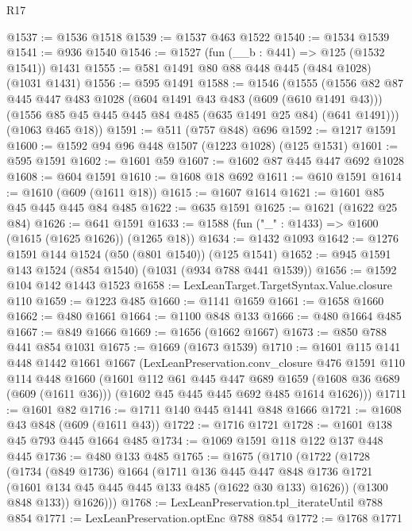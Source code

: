 \begin{lexlean}{R17}
\begin{coremodule}
@1537 := @1536 @1518
@1539 := @1537 @463 @1522
@1540 := @1534 @1539
@1541 := @936 @1540
@1546 := @1527 (fun (__b : @441) => @125 (@1532 @1541)) @1431
@1555 := @581 @1491 @80 @88 @448 @445 (@484 @1028) (@1031 @1431)
@1556 := @595 @1491
@1588 := @1546
    (@1555
      (@1556
        @82
        @87
        @445
        @447
        @483
        @1028
        (@604 @1491 @43 @483 (@609 (@610 @1491 @43)))
        (@1556 @85 @45 @445 @445 @84 @485 (@635 @1491 @25 @84) (@641 @1491)))
      (@1063 @465 @18))
@1591 := @511 (@757 @848) @696
@1592 := @1217 @1591
@1600 := @1592 @94 @96 @448 @1507 (@1223 @1028) (@125 @1531)
@1601 := @595 @1591
@1602 := @1601 @59
@1607 := @1602 @87 @445 @447 @692 @1028
@1608 := @604 @1591
@1610 := @1608 @18 @692
@1611 := @610 @1591
@1614 := @1610 (@609 (@1611 @18))
@1615 := @1607 @1614
@1621 := @1601 @85 @45 @445 @445 @84 @485
@1622 := @635 @1591
@1625 := @1621 (@1622 @25 @84)
@1626 := @641 @1591
@1633 := @1588 (fun ("_" : @1433) => @1600 (@1615 (@1625 @1626)) (@1265 @18))
@1634 := @1432 @1093
@1642 := @1276 @1591 @144 @1524 (@50 (@801 @1540)) (@125 @1541)
@1652 := @945 @1591 @143 @1524 (@854 @1540) (@1031 (@934 @788 @441 @1539))
@1656 := @1592 @104 @142 @1443 @1523
@1658 := LexLeanTarget.TargetSyntax.Value.closure @110
@1659 := @1223 @485
@1660 := @1141 @1659
@1661 := @1658 @1660
@1662 := @480 @1661
@1664 := @1100 @848 @133
@1666 := @480 @1664 @485
@1667 := @849 @1666
@1669 := @1656 (@1662 @1667)
@1673 := @850 @788 @441 @854 @1031
@1675 := @1669 (@1673 @1539)
@1710 := @1601
    @115
    @141
    @448
    @1442
    @1661
    @1667
    (LexLeanPreservation.conv_closure
      @476
      @1591
      @110
      @114
      @448
      @1660
      (@1601
        @112
        @61
        @445
        @447
        @689
        @1659
        (@1608 @36 @689 (@609 (@1611 @36)))
        (@1602 @45 @445 @445 @692 @485 @1614 @1626)))
@1711 := @1601 @82
@1716 := @1711 @140 @445 @1441 @848 @1666
@1721 := @1608 @43 @848 (@609 (@1611 @43))
@1722 := @1716 @1721
@1728 := @1601 @138 @45 @793 @445 @1664 @485
@1734 := @1069 @1591 @118 @122 @137 @448 @445
@1736 := @480 @133 @485
@1765 := @1675
    (@1710
      (@1722
        (@1728
          (@1734
            (@849 @1736)
            @1664
            (@1711
              @136
              @445
              @447
              @848
              @1736
              @1721
              (@1601 @134 @45 @445 @445 @133 @485 (@1622 @30 @133) @1626))
            (@1300 @848 @133))
          @1626)))
@1768 := LexLeanPreservation.tpl_iterateUntil @788 @854
@1771 := LexLeanPreservation.optEnc @788 @854
@1772 := @1768 @1771

\end{coremodule}
\end{lexlean}
